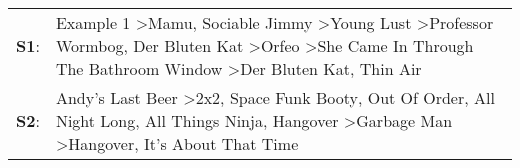\begin{supertabular}{p{0.03\textwidth}p{0.92\textwidth}}
 \textbf{S1}:  &  Example 1\textsuperscript{} \textgreater \enspace Mamu\textsuperscript{}, \enspace Sociable Jimmy\textsuperscript{} \textgreater \enspace Young Lust\textsuperscript{} \textgreater \enspace Professor Wormbog\textsuperscript{}, \enspace Der Bluten Kat\textsuperscript{} \textgreater \enspace Orfeo\textsuperscript{} \textgreater \enspace She Came In Through The Bathroom Window\textsuperscript{} \textgreater \enspace Der Bluten Kat\textsuperscript{}, \enspace Thin Air\textsuperscript{}  \enspace  \\
 \textbf{S2}:  &                                                Andy's Last Beer\textsuperscript{} \textgreater \enspace 2x2\textsuperscript{}, \enspace Space Funk Booty\textsuperscript{}, \enspace Out Of Order\textsuperscript{}, \enspace All Night Long\textsuperscript{}, \enspace All Things Ninja\textsuperscript{}, \enspace Hangover\textsuperscript{} \textgreater \enspace Garbage Man\textsuperscript{} \textgreater \enspace Hangover\textsuperscript{}, \enspace It's About That Time\textsuperscript{}  \enspace  \\
\end{supertabular}
